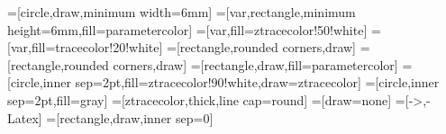 \usetikzlibrary{arrows.meta}
\usetikzlibrary{backgrounds}
\usetikzlibrary{calc}
\usetikzlibrary{decorations.pathreplacing}
\usetikzlibrary{fit}
\usetikzlibrary{spy}
\usetikzlibrary{3d}
\pgfplotsset{compat=1.18}

=[circle,draw,minimum width=6mm]
=[var,rectangle,minimum height=6mm,fill=parametercolor]
=[var,fill=ztracecolor!50!white]
=[var,fill=tracecolor!20!white]
=[rectangle,rounded corners,draw]
=[rectangle,rounded corners,draw]
=[rectangle,draw,fill=parametercolor]
=[circle,inner sep=2pt,fill=ztracecolor!90!white,draw=ztracecolor]
=[circle,inner sep=2pt,fill=gray]
=[ztracecolor,thick,line cap=round]
=[draw=none]
=[->,-{Latex}]
=[rectangle,draw,inner sep=0]
